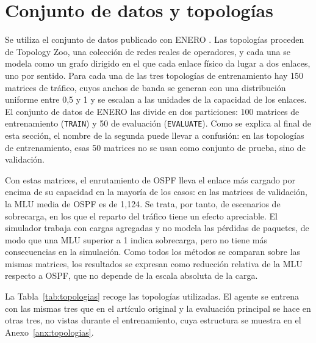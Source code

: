 \section{Conjunto de datos y topologías}\label{sec:datos}

Se utiliza el conjunto de datos publicado con ENERO \cite{ALMASAN2022109166}. Las topologías proceden de Topology Zoo, una colección de redes reales de operadores, y cada una se modela como un grafo dirigido en el que cada enlace físico da lugar a dos enlaces, uno por sentido. Para cada una de las tres topologías de entrenamiento hay 150 matrices de tráfico, cuyos anchos de banda se generan con una distribución uniforme entre 0,5 y 1 y se escalan a las unidades de la capacidad de los enlaces. El conjunto de datos de ENERO las divide en dos particiones: 100 matrices de entrenamiento (\texttt{TRAIN}) y 50 de evaluación (\texttt{EVALUATE}). Como se explica al final de esta sección, el nombre de la segunda puede llevar a confusión: en las topologías de entrenamiento, esas 50 matrices no se usan como conjunto de prueba, sino de validación.

Con estas matrices, el enrutamiento de OSPF lleva el enlace más cargado por encima de su capacidad en la mayoría de los casos: en las matrices de validación, la MLU media de OSPF es de 1,124. Se trata, por tanto, de escenarios de sobrecarga, en los que el reparto del tráfico tiene un efecto apreciable. El simulador trabaja con cargas agregadas y no modela las pérdidas de paquetes, de modo que una MLU superior a 1 indica sobrecarga, pero no tiene más consecuencias en la simulación. Como todos los métodos se comparan sobre las mismas matrices, los resultados se expresan como reducción relativa de la MLU respecto a OSPF, que no depende de la escala absoluta de la carga.

La Tabla~\ref{tab:topologias} recoge las topologías utilizadas. El agente se entrena con las mismas tres que en el artículo original y la evaluación principal se hace en otras tres, no vistas durante el entrenamiento, cuya estructura se muestra en el Anexo~\ref{anx:topologias}.

